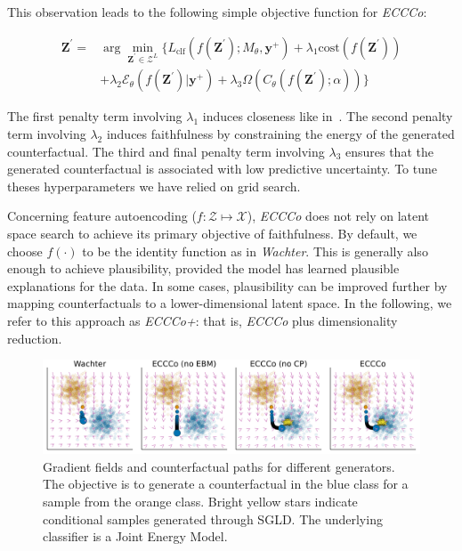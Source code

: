 This observation leads to the following simple objective function for \textit{ECCCo}:

\begin{equation} \label{eq:eccco}
  \begin{aligned}
  \mathbf{Z}^\prime =& \arg \min_{\mathbf{Z}^\prime \in \mathcal{Z}^L} \{  {L_{\text{clf}}(f(\mathbf{Z}^\prime);M_{\theta},\mathbf{y}^+)}+ \lambda_1 {\text{cost}(f(\mathbf{Z}^\prime)) } \\
  &+ \lambda_2 \mathcal{E}_{\theta}(f(\mathbf{Z}^\prime)|\mathbf{y}^+) + \lambda_3 \Omega(C_{\theta}(f(\mathbf{Z}^\prime);\alpha)) \} 
  \end{aligned} 
\end{equation}

The first penalty term involving $\lambda_1$ induces closeness like in~\citet{wachter2017counterfactual}. The second penalty term involving $\lambda_2$ induces faithfulness by constraining the energy of the generated counterfactual. The third and final penalty term involving $\lambda_3$ ensures that the generated counterfactual is associated with low predictive uncertainty. To tune theses hyperparameters we have relied on grid search.

Concerning feature autoencoding ($f: \mathcal{Z} \mapsto \mathcal{X}$), \textit{ECCCo} does not rely on latent space search to achieve its primary objective of faithfulness. By default, we choose $f(\cdot)$ to be the identity function as in \textit{Wachter}. This is generally also enough to achieve plausibility, provided the model has learned plausible explanations for the data. In some cases, plausibility can be improved further by mapping counterfactuals to a lower-dimensional latent space. In the following, we refer to this approach as \textit{ECCCo+}: that is, \textit{ECCCo} plus dimensionality reduction.

\begin{figure}
  \centering
  \includegraphics[width=0.75\linewidth]{../artifacts/results/images/poc_gradient_fields.png}
  \caption{Gradient fields and counterfactual paths for different generators. The objective is to generate a counterfactual in the blue class for a sample from the orange class. Bright yellow stars indicate conditional samples generated through SGLD. The underlying classifier is a Joint Energy Model.}\label{fig:poc}
\end{figure}  

